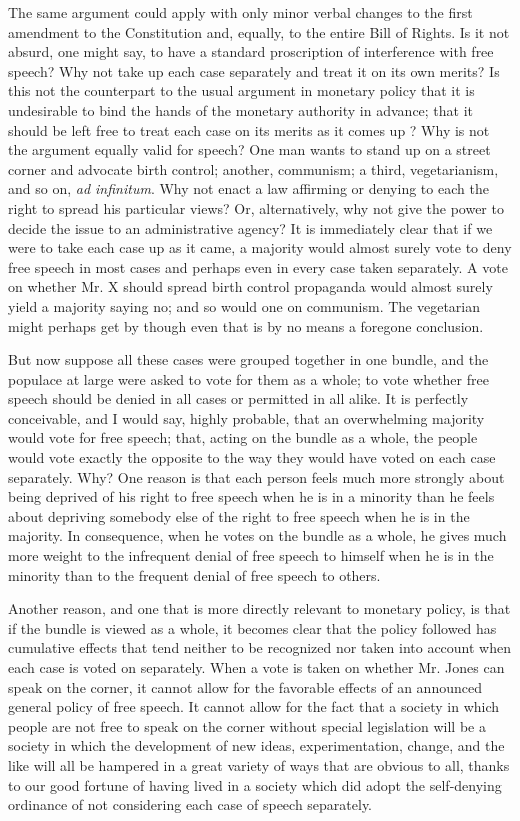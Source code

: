 \documentclass[11pt,openany]{book}
\begin{document}
The same argument could apply with only minor verbal changes to the first amendment to the Constitution and, equally, to the entire Bill of Rights. Is it not absurd, one might say, to have a standard proscription of interference with free speech? Why not take up each case separately and treat it on its own merits? Is this not the counterpart to the usual argument in monetary policy that it is undesirable to bind the hands of the monetary authority in advance; that it should be left free to treat each case on its merits as it comes up ? Why is not the argument equally valid for speech? One man wants to stand up on a street corner and advocate birth control; another, communism; a third, vegetarianism, and so on, \emph{ad infinitum}. Why not enact a law affirming or denying to each the right to spread his particular views? Or, alternatively, why not give the power to decide the issue to an administrative agency? It is immediately clear that if we were to take each case up as it came, a majority would almost surely vote to deny free speech in most cases and perhaps even in every case taken separately. A vote on whether Mr. X should spread birth control propaganda would almost surely yield a majority saying no; and so would one on communism. The vegetarian might perhaps get by though even that is by no means a foregone conclusion.

But now suppose all these cases were grouped together in one bundle, and the populace at large were asked to vote for them as a whole; to vote whether free speech should be denied in all cases or permitted in all alike. It is perfectly conceivable, and I would say, highly probable, that an overwhelming majority would vote for free speech; that, acting on the bundle as a whole, the people would vote exactly the opposite to the way they would have voted on each case separately. Why? One reason is that each person feels much more strongly about being deprived of his right to free speech when he is in a minority than he feels about depriving somebody else of the right to free speech when he is in the majority. In consequence, when he votes on the bundle as a whole, he gives much more weight to the infrequent denial of free speech to himself when he is in the minority than to the frequent denial of free speech to others.

Another reason, and one that is more directly relevant to monetary policy, is that if the bundle is viewed as a whole, it becomes clear that the policy followed has cumulative effects that tend neither to be recognized nor taken into account when each case is voted on separately. When a vote is taken on whether Mr. Jones can speak on the corner, it cannot allow for the favorable effects of an announced general policy of free speech. It cannot allow for the fact that a society in which people are not free to speak on the corner without special legislation will be a society in which the development of new ideas, experimentation, change, and the like will all be hampered in a great variety of ways that are obvious to all, thanks to our good fortune of having lived in a society which did adopt the self-denying ordinance of not considering each case of speech separately.
\end{document}
